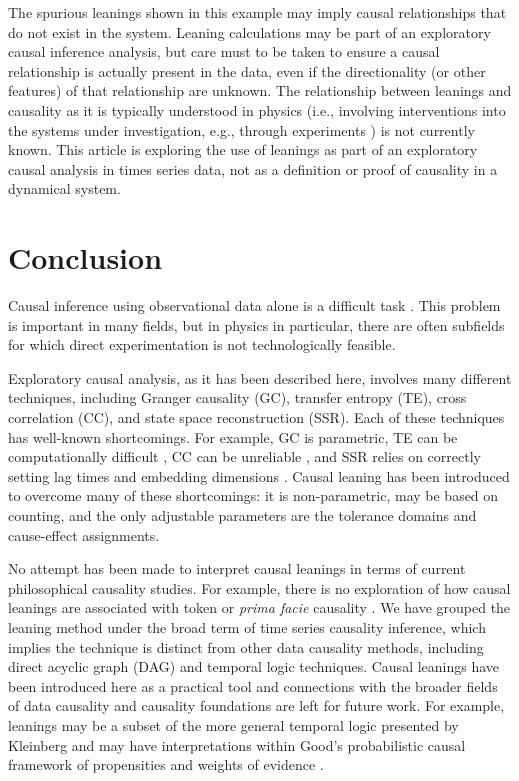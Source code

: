 \documentclass[twocolumn,aps,pre,groupedaddress]{revtex4-1}
\begin{document}
The spurious leanings shown in this example may imply causal relationships that do not exist in the system.  Leaning calculations may be part of an exploratory causal inference analysis, but care must to be taken to ensure a causal relationship is actually present in the data, even if the directionality (or other features) of that relationship are unknown.  The relationship between leanings and causality as it is typically understood in physics (i.e., involving interventions into the systems under investigation, e.g., through experiments \cite{Pearl2000}) is not currently known.  This article is exploring the use of leanings as part of an exploratory causal analysis in times series data, not as a definition or proof of causality in a dynamical system.   

\section{Conclusion}
Causal inference using observational data alone is a difficult task \cite{kleinberg2012}.  This problem is important in many fields, but in physics in particular, there are often subfields for which direct experimentation is not technologically feasible. 

Exploratory causal analysis, as it has been described here, involves many different techniques, including Granger causality (GC), transfer entropy (TE), cross correlation (CC), and state space reconstruction (SSR).  Each of these techniques has well-known shortcomings.  For example, GC is parametric, TE can be computationally difficult \cite{kaiser2002}, CC can be unreliable \cite{Rogosa1980}, and SSR relies on correctly setting lag times and embedding dimensions \cite{Small2004}.  Causal leaning has been introduced to overcome many of these shortcomings: it is non-parametric, may be based on counting, and the only adjustable parameters are the tolerance domains and cause-effect assignments.  

No attempt has been made to interpret causal leanings in terms of current philosophical causality studies.   For example, there is no exploration of how causal leanings are associated with token or {\em prima facie} causality \cite{kleinberg2012}.  We have grouped the leaning method under the broad term of time series causality inference, which implies the technique is distinct from other data causality methods, including direct acyclic graph (DAG) \cite{Pearl2000} and temporal logic \cite{kleinberg2012} techniques.  Causal leanings have been introduced here as a practical tool and connections with the broader fields of data causality and causality foundations are left for future work.  For example, leanings may be a subset of the more general temporal logic presented by Kleinberg \cite{kleinberg2012} and may have interpretations within Good's probabilistic causal framework of propensities and weights of evidence \cite{Good1984}.
\end{document}
